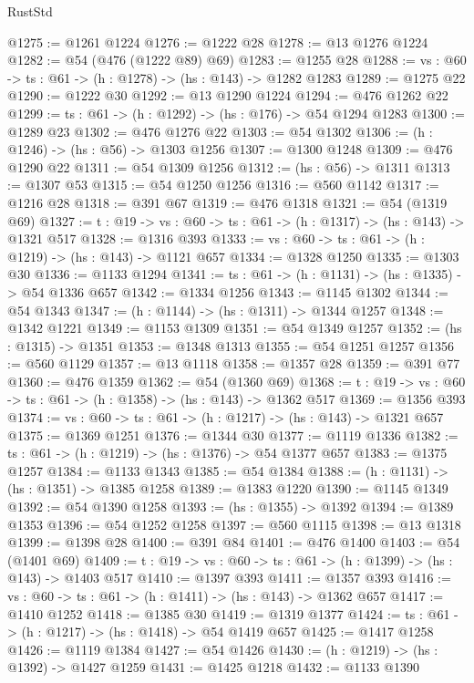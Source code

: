 \begin{lexlean}{RustStd}
\begin{coremodule}
@1275 := @1261 @1224
@1276 := @1222 @28
@1278 := @13 @1276 @1224
@1282 := @54 (@476 (@1222 @89) @69)
@1283 := @1255 @28
@1288 := {vs : @60} -> {ts : @61} -> (h : @1278) -> (hs : @143) -> @1282 @1283
@1289 := @1275 @22
@1290 := @1222 @30
@1292 := @13 @1290 @1224
@1294 := @476 @1262 @22
@1299 := {ts : @61} -> (h : @1292) -> (hs : @176) -> @54 @1294 @1283
@1300 := @1289 @23
@1302 := @476 @1276 @22
@1303 := @54 @1302
@1306 := (h : @1246) -> (hs : @56) -> @1303 @1256
@1307 := @1300 @1248
@1309 := @476 @1290 @22
@1311 := @54 @1309 @1256
@1312 := (hs : @56) -> @1311
@1313 := @1307 @53
@1315 := @54 @1250 @1256
@1316 := @560 @1142
@1317 := @1216 @28
@1318 := @391 @67
@1319 := @476 @1318
@1321 := @54 (@1319 @69)
@1327 := {t : @19} -> {vs : @60} -> {ts : @61} -> (h : @1317) -> (hs : @143) -> @1321 @517
@1328 := @1316 @393
@1333 := {vs : @60} -> {ts : @61} -> (h : @1219) -> (hs : @143) -> @1121 @657
@1334 := @1328 @1250
@1335 := @1303 @30
@1336 := @1133 @1294
@1341 := {ts : @61} -> (h : @1131) -> (hs : @1335) -> @54 @1336 @657
@1342 := @1334 @1256
@1343 := @1145 @1302
@1344 := @54 @1343
@1347 := (h : @1144) -> (hs : @1311) -> @1344 @1257
@1348 := @1342 @1221
@1349 := @1153 @1309
@1351 := @54 @1349 @1257
@1352 := (hs : @1315) -> @1351
@1353 := @1348 @1313
@1355 := @54 @1251 @1257
@1356 := @560 @1129
@1357 := @13 @1118
@1358 := @1357 @28
@1359 := @391 @77
@1360 := @476 @1359
@1362 := @54 (@1360 @69)
@1368 := {t : @19} -> {vs : @60} -> {ts : @61} -> (h : @1358) -> (hs : @143) -> @1362 @517
@1369 := @1356 @393
@1374 := {vs : @60} -> {ts : @61} -> (h : @1217) -> (hs : @143) -> @1321 @657
@1375 := @1369 @1251
@1376 := @1344 @30
@1377 := @1119 @1336
@1382 := {ts : @61} -> (h : @1219) -> (hs : @1376) -> @54 @1377 @657
@1383 := @1375 @1257
@1384 := @1133 @1343
@1385 := @54 @1384
@1388 := (h : @1131) -> (hs : @1351) -> @1385 @1258
@1389 := @1383 @1220
@1390 := @1145 @1349
@1392 := @54 @1390 @1258
@1393 := (hs : @1355) -> @1392
@1394 := @1389 @1353
@1396 := @54 @1252 @1258
@1397 := @560 @1115
@1398 := @13 @1318
@1399 := @1398 @28
@1400 := @391 @84
@1401 := @476 @1400
@1403 := @54 (@1401 @69)
@1409 := {t : @19} -> {vs : @60} -> {ts : @61} -> (h : @1399) -> (hs : @143) -> @1403 @517
@1410 := @1397 @393
@1411 := @1357 @393
@1416 := {vs : @60} -> {ts : @61} -> (h : @1411) -> (hs : @143) -> @1362 @657
@1417 := @1410 @1252
@1418 := @1385 @30
@1419 := @1319 @1377
@1424 := {ts : @61} -> (h : @1217) -> (hs : @1418) -> @54 @1419 @657
@1425 := @1417 @1258
@1426 := @1119 @1384
@1427 := @54 @1426
@1430 := (h : @1219) -> (hs : @1392) -> @1427 @1259
@1431 := @1425 @1218
@1432 := @1133 @1390

\end{coremodule}
\end{lexlean}
